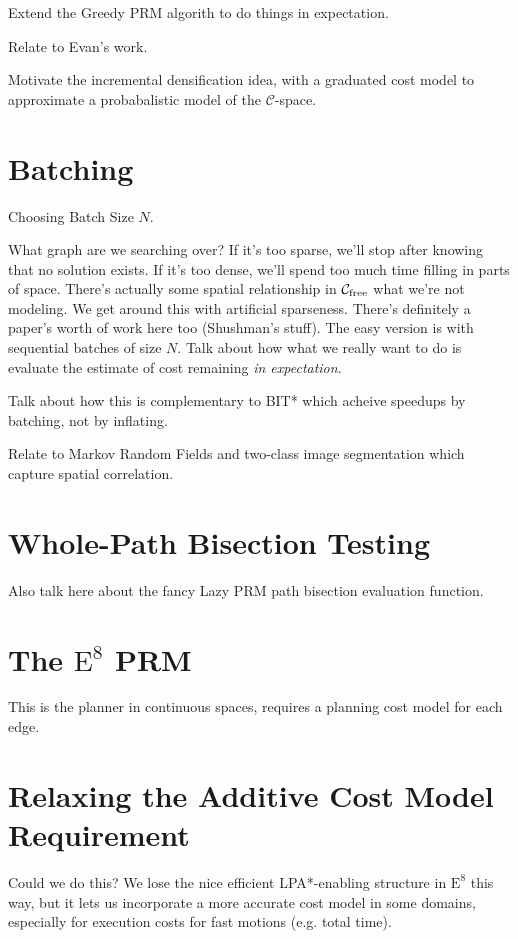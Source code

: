 \documentclass{report}
\begin{document}
Extend the Greedy PRM algorith to do things in expectation.

Relate to Evan's work.

Motivate the incremental densification idea,
with a graduated cost model
to approximate a probabalistic model
of the $\mathcal{C}$-space.

\section{Batching}

Choosing Batch Size $N$.

What graph are we searching over?
If it's too sparse, we'll stop after knowing that no solution exists.
If it's too dense, we'll spend too much time filling in parts of
space.
There's actually some spatial relationship in
$\mathcal{C}_{\mbox{\scriptsize free}}$ what we're not
modeling.
We get around this with artificial sparseness.
There's definitely a paper's worth of work here too (Shushman's stuff).
The easy version is with sequential batches of size $N$.
Talk about how what we really want to do
is evaluate the estimate of cost remaining
\emph{in expectation}.

Talk about how this is complementary to BIT* which acheive speedups
by batching, not by inflating.

Relate to Markov Random Fields and two-class image segmentation
which capture spatial correlation.

\section{Whole-Path Bisection Testing}

Also talk here about the fancy Lazy PRM path bisection
evaluation function.

\section{The $\mbox{E}^8$ PRM}

This is the planner in continuous spaces,
requires a planning cost model for each edge.

\section{Relaxing the Additive Cost Model Requirement}

Could we do this?
We lose the nice efficient LPA*-enabling structure in
$\mbox{E}^8$ this way,
but it lets us incorporate a more accurate cost model in some domains,
especially for execution costs for fast motions (e.g. total time).
\end{document}
